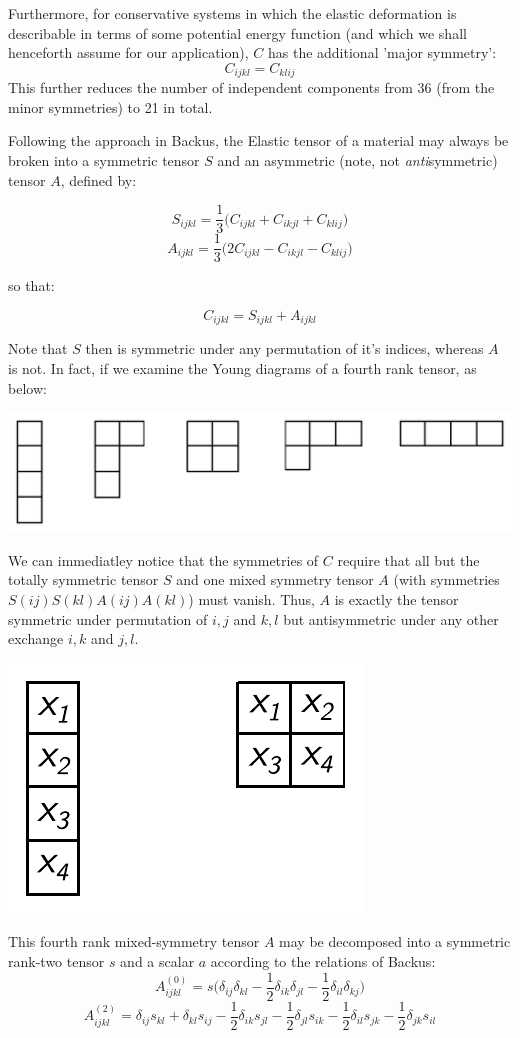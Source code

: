 \documentclass[10pt,a4paper]{article}
\begin{document}
Furthermore, for conservative systems in which the elastic deformation is describable in terms of some potential energy function (and which we shall henceforth assume for our application), $C$ has the additional 'major symmetry':
$$
C_{ijkl}=C_{klij}
$$
This further reduces the number of independent components from 36 (from the minor symmetries) to 21 in total.


Following the approach in Backus, the Elastic tensor of a material may always be broken into a symmetric tensor $S$ and an asymmetric (note, not \textit{anti}symmetric) tensor $A$, defined by:

$$
S_{ijkl}=\frac{1}{3}\big( C_{ijkl} + C_{ikjl} + C_{klij} \big)
$$
$$
A_{ijkl} = \frac{1}{3}\big( 2C_{ijkl} -C_{ikjl} -C_{klij}  \big)
$$
\begin{center}
so that:
\end{center}
$$
C_{ijkl} = S_{ijkl} + A_{ijkl}
$$

Note that $S$ then is symmetric under any permutation of it's indices, whereas $A$ is not. In fact, if we examine the Young diagrams of a fourth rank tensor, as below: 

\begin{center}
\includegraphics[scale=0.7]{rank4_young.pdf}
\end{center}

We can immediatley notice that the symmetries of $C$ require that all but the totally symmetric tensor $S$ and one mixed symmetry tensor $A$ (with symmetries $S(ij)S(kl)A(ij)A(kl)$) must vanish. Thus, $A$ is exactly the tensor symmetric under permutation of $i,j$ and $k,l$ but antisymmetric under any other exchange $i,k$ and $j,l$.
\begin{center}
\includegraphics[scale=0.7]{elastic_young.pdf}
\end{center}
This fourth rank mixed-symmetry tensor $A$ may be decomposed into a symmetric rank-two tensor $s$ and a scalar $a$ according to the relations of Backus:
$$
A_{ijkl}^{(0)}=s\big(\delta_{ij}\delta_{kl}-\frac{1}{2}\delta_{ik}\delta_{jl}-\frac{1}{2}\delta_{il}\delta_{kj}\big)
$$
$$
A_{ijkl}^{(2)}=\delta_{ij}s_{kl} + \delta_{kl}s_{ij} - \frac{1}{2}\delta_{ik}s_{jl}- \frac{1}{2}\delta_{jl}s_{ik}- \frac{1}{2}\delta_{il}s_{jk}- \frac{1}{2}\delta_{jk}s_{il}
$$
\end{document}
